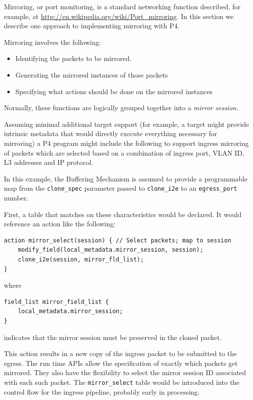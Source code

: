 \documentclass[12pt]{article}
\begin{document}

Mirroring, or port monitoring, is a standard networking function described, 
for example, at \url{http://en.wikipedia.org/wiki/Port_mirroring}.
In this section 
we describe one approach to implementing mirroring with P4.

Mirroring involves the following:

\begin{itemize}
\item
Identifying the packets to be mirrored.
\item
Generating the mirrored instances of those packets
\item
Specifying what actions should be done on the mirrored instances
\end{itemize}


Normally, these functions are logically grouped together into a \textit{mirror session.}

Assuming minimal additional target support (for example, a target might provide 
intrinsic metadata that would directly execute everything necessary for mirroring) 
a P4 program might include the following to support ingress mirroring of packets 
which are selected based on a combination of ingress port, VLAN ID, L3 addresses 
and IP protocol.

In this example, the Buffering Mechanism is assumed to provide a programmable 
map from the \texttt{clone_spec} parameter passed to \texttt{clone_i2e} to an \texttt{egress_port} number.

First, a table that matches on these characteristics would be declared. It 
would reference an action like the following:

\begin{lstlisting}[keywords={},frame=single,escapechar=\@]
action mirror_select(session) { // Select packets; map to session
    modify_field(local_metadata.mirror_session, session);
    clone_i2e(session, mirror_fld_list);
}
\end{lstlisting}

where

\begin{lstlisting}[keywords={},frame=single,escapechar=\@]
field_list mirror_field_list {
    local_metadata.mirror_session;
}
\end{lstlisting}


indicates that the mirror session must be preserved in the cloned packet.

This action results in a new copy of the ingress packet to be submitted to 
the egress. The run time APIs allow the specification of exactly which packets 
get mirrored. They also have the flexibility to select the mirror session 
ID associated with each such packet. The \texttt{mirror_select} table would be introduced 
into the control flow for the ingress pipeline, probably early in processing. 
\end{document}
